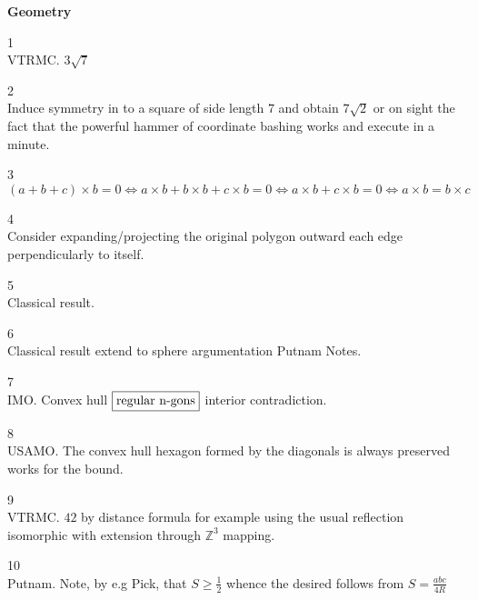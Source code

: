 \newpage

\textbf{Geometry}

1 \\
VTRMC. $\boxed{3\sqrt{7}}$

2 \\
Induce symmetry in to a square of side length $7$ and obtain $\boxed{7\sqrt{2}}$ or on sight the fact that the powerful hammer of coordinate bashing works and execute in a minute.

3 \\
$(a+b+c) \times b=0 \iff a \times b + b \times b + c \times b =0 \iff a \times b + c \times b = 0 \iff a \times b = b \times c$

4 \\
Consider expanding/projecting the original polygon outward each edge perpendicularly to itself.

5 \\
Classical result.

6 \\
Classical result extend to sphere argumentation Putnam Notes.

7 \\
IMO. Convex hull $\boxed{\text{regular }$n$\text{-gons}}$ interior contradiction.

8 \\
USAMO. The convex hull hexagon formed by the diagonals is always preserved works for the bound.

9 \\
VTRMC. $\boxed{42}$ by distance formula for example using the usual reflection isomorphic with extension through $\mathbb{Z}^3$ mapping.

10 \\
Putnam. Note, by e.g Pick, that $S \ge \frac{1}{2}$ whence the desired follows from $S=\frac{abc}{4R}$
